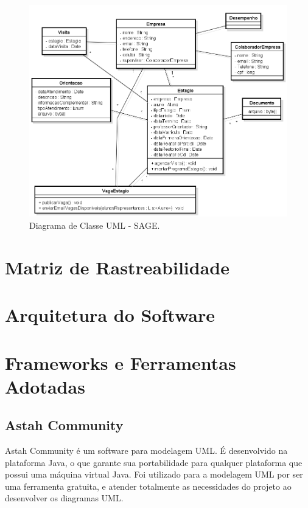 \begin{figure}[H]
 \centering \includegraphics[scale=0.5]{imagens/DiagramaDeClasse.png}
 \caption{Diagrama de Classe UML - SAGE.}
 \label{img:DiagramaDeClasse.png}
\end{figure}

\section{Matriz de Rastreabilidade}
\label{sec:diagramas}

\section{Arquitetura do Software}
\label{sec:arquitetura}

\section{Frameworks e Ferramentas Adotadas}
\label{sec:frameworksFerramentasAdotadas}

\subsection{Astah Community}
\label{sec:astahcommunity}

Astah Community é um software para modelagem UML. É desenvolvido na plataforma
Java, o que garante sua portabilidade para qualquer plataforma que possui uma
máquina virtual Java. Foi utilizado para a modelagem UML por ser uma ferramenta
gratuita, e atender totalmente as necessidades do projeto ao desenvolver os
diagramas UML.

